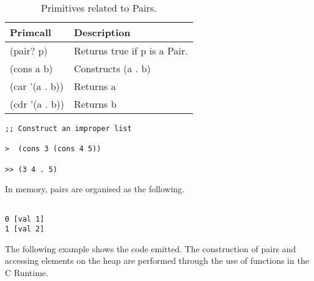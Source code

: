 \documentclass{article}
\begin{document}
\begin{table}[ht]
  \centering
\begin{tabular}{ l l }
  \toprule
  Primcall & Description \\ \hline
  \midrule
  (pair? p) & Returns true if p is a Pair.   \\
  (cons a b) & Constructs (a . b)  \\
  (car '(a . b)) & Returns a \\
  (cdr '(a . b)) & Returns b \\
  \bottomrule
\end{tabular}
\caption{Primitives related to Pairs.} \label{tab:pairs}
\end{table}

\begin{verbatim}
;; Construct an improper list

>  (cons 3 (cons 4 5))

>> (3 4 . 5)
\end{verbatim}

In memory, pairs are organised as the following. 

\begin{verbatim}

0 [val 1]
1 [val 2]

\end{verbatim}

The following example shows the code emitted. The construction of pairs and accessing elements on the heap are performed through the use of functions in the C Runtime.
\end{document}
